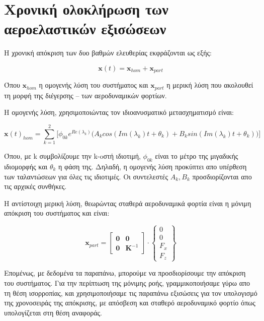 \section{Χρονική ολοκλήρωση των αεροελαστικών εξισώσεων}

Η χρονική απόκριση των δυο βαθμών ελευθερίας εκφράζονται ως εξής:

\begin{equation}
    \mathbf{x}(t) = \mathbf{x}_{hom} + \mathbf{x}_{part}
    \label{eq:timesol}
\end{equation}

Όπου $\mathbf{x}_{hom}$ η ομογενής λύση του συστήματος και $\mathbf{x}_{part}$ η μερική λύση που ακολουθεί τη μορφή της διέγερσης -- των αεροδυναμικών φορτίων.

Η ομογενής λύση, χρησιμοποιώντας τον ιδιοανυσματικό μετασχηματισμό είναι:

\begin{equation}
    \mathbf{x}(t)_{hom} = \sum_{k=1}^2\Bigg[\phi_{0k}e^{Re(\lambda_k)}\Big(A_kcos(Im(\lambda_k)t+\theta_k)+B_ksin(Im(\lambda_k)t+\theta_k)\Big)\Bigg]
    \label{eq:homogenous}
\end{equation}

Όπου, με k συμβολίζουμε την k-oστή ιδιοτιμή, $\phi_{0k}$ είναι το μέτρο της μιγαδικής ιδιομορφής και $\theta_k$ η φάση της. Δηλαδή, η ομογενής λύση προκύπτει απο υπέρθεση των ταλαντώσεων για όλες τις ιδιοτιμές. Οι συντελεστές $A_k, B_k$ προσδιορίζονται απο τις αρχικές συνθήκες. 

Η αντίστοιχη μερική λύση, θεωρώντας σταθερά αεροδυναμικά φορτία είναι η μόνιμη απόκριση του συστήματος και είναι:

\begin{equation}
    \mathbf{x}_{part} = \begin{bmatrix}
    \mathbf{0} & \mathbf{0}\\
    \mathbf{0} & \mathbf{K}^{-1}
    \end{bmatrix}
    \cdot
    \begin{Bmatrix}
    0\\0\\F_x\\F_z
    \end{Bmatrix}
    \label{eq:partial}
\end{equation}

Επομένως, με δεδομένα τα παραπάνω, μπορούμε να προσδιορίσουμε την απόκριση του συστήματος. Για την περίπτωση της μόνιμης ροής, γραμμικοποιήσαμε γύρω απο τη θέση ισορροπίας, και χρησιμοποιήσαμε τις παραπάνω εξισώσεις για τον υπολογισμό της χρονοσειράς της απόκρισης, με απόσβεση και σταθερό αεροδυναμικό φορτίο όπως υπολογίζεται στη θέση αναφοράς.

